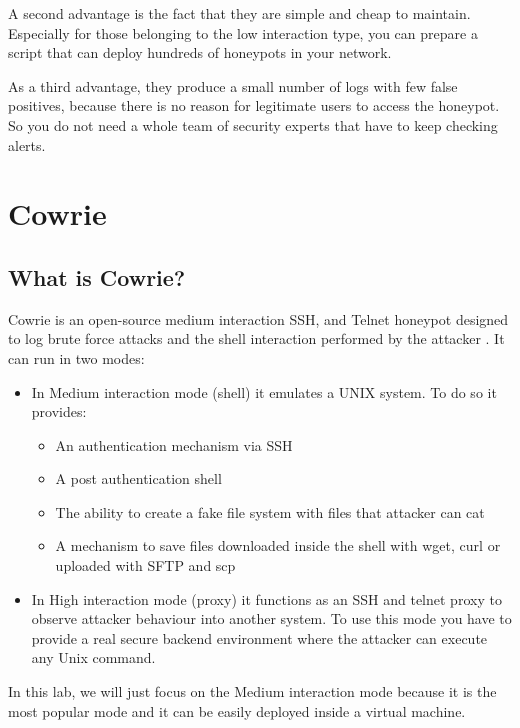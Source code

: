 \documentclass[epsfig,a4paper,11pt,titlepage,oneside,openany]{book}
\begin{document}
A second advantage is the fact that they are simple and cheap  to maintain. Especially for those belonging to the low interaction type, you can prepare a script that can deploy hundreds of honeypots in your network.

As a third advantage, they produce a small number of logs with few false positives, because there is no reason for legitimate users to access the honeypot. So you do not need a whole team of security experts that have to keep checking alerts.

\chapter{Cowrie}

\section{What is Cowrie?}

Cowrie is an open-source medium interaction SSH, and Telnet honeypot designed to log brute force attacks and the shell interaction performed by the attacker \cite{whatcowrie}.
It can run in two modes:
\begin{itemize}
\itemsep0em
\item In Medium interaction mode (shell) it emulates a UNIX system. To do so it provides:
	\begin{itemize}
	\itemsep0em
	\item An authentication mechanism via SSH
	\item A  post authentication shell
	\item The ability to create a fake file system with files that attacker can cat
	\item A mechanism to save files downloaded inside the shell with wget, curl or uploaded with SFTP and scp
	\end{itemize}
\item In High interaction mode (proxy) it functions as an SSH and telnet proxy to observe attacker behaviour into another system. To use this mode you have to provide a real secure backend environment where the attacker can execute any Unix command.
\end{itemize}

\noindent In this lab, we will just focus on the Medium interaction mode because it is the most popular mode and it can be easily deployed inside a virtual machine.
\end{document}
